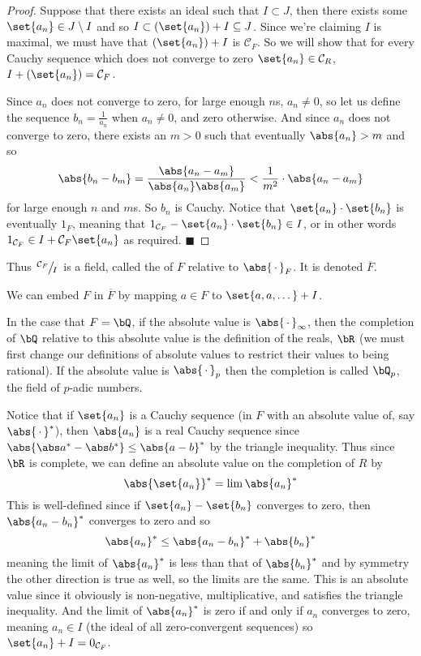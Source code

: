 \documentclass[10pt]{article}
\def\qed{%
    \ifmmode%
        \eqno\blacksquare%
    \else%
        \hskip1cm\allowbreak\hbox{}\nobreak\hfill$\blacksquare$%
    \fi%
}
\def\mC{\mathcal C}
\begin{document}
\begin{proof}

    Suppose that there exists an ideal such that $I\subset J$, then there exists some $\set{a_n}\in J\setminus I$ and so $I\subset(\set{a_n})+I\subseteq J$.
    Since we're claiming $I$ is maximal, we must have that $(\set{a_n})+I$ is $\mC_F$.
    So we will show that for every Cauchy sequence which does not converge to zero $\set{a_n}\in\mC_R$, $I+(\set{a_n})=\mC_F$.

    Since $a_n$ does not converge to zero, for large enough $n$s, $a_n\neq0$, so let us define the sequence $b_n=\frac1{a_n}$ when $a_n\neq0$, and zero otherwise.
    And since $a_n$ does not converge to zero, there exists an $m>0$ such that eventually $\abs{a_n}>m$ and so
    \[ \abs{b_n-b_m} = \frac{\abs{a_n-a_m}}{\abs{a_n}\abs{a_m}} < \frac1{m^2}\cdot\abs{a_n-a_m} \]
    for large enough $n$ and $m$s.
    So $b_n$ is Cauchy.
    Notice that $\set{a_n}\cdot\set{b_n}$ is eventually $1_F$, meaning that $1_{\mC_F}-\set{a_n}\cdot\set{b_n}\in I$, or in other words $1_{\mC_F}\in I+\mC_F\set{a_n}$ as required.
    \qed

\end{proof}

\begin{defn*}

    Thus $\slfrac{\mC_F}I$ is a field, called the  of $F$ relative to $\abs{\,\cdot\,}_F$.
    It is denoted $\overline F$.

\end{defn*}

We can embed $F$ in $\overline F$ by mapping $a\in F$ to $\set{a,a,\dots}+I$.

In the case that $F=\bQ$, if the absolute value is $\abs{\,\cdot\,}_\infty$, then the completion of $\bQ$ relative to this absolute value is the definition of the reals, $\bR$ (we must first change our
definitions of absolute values to restrict their values to being rational).
If the absolute value is $\abs{\,\cdot\,}_p$ then the completion is called $\bQ_p$, the field of $p$-adic numbers.

Notice that if $\set{a_n}$ is a Cauchy sequence (in $F$ with an absolute value of, say $\abs{\,\cdot\,}^*$), then $\abs{a_n}$ is a real Cauchy sequence since $\abs{\abs a^*-\abs b^*}\leq\abs{a-b}^*$ by the 
triangle inequality.
Thus since $\bR$ is complete, we can define an absolute value on the completion of $R$ by
\[ \abs{\set{a_n}}^* = \lim\abs{a_n}^* \]
This is well-defined since if $\set{a_n}-\set{b_n}$ converges to zero, then $\abs{a_n-b_n}^*$ converges to zero and so
\[ \abs{a_n}^* \leq \abs{a_n-b_n}^* + \abs{b_n}^* \]
meaning the limit of $\abs{a_n}^*$ is less than that of $\abs{b_n}^*$ and by symmetry the other direction is true as well, so the limits are the same.
This is an absolute value since it obviously is non-negative, multiplicative, and satisfies the triangle inequality.
And the limit of $\abs{a_n}^*$ is zero if and only if $a_n$ converges to zero, meaning $a_n\in I$ (the ideal of all zero-convergent sequences) so $\set{a_n}+I=0_{\mC_F}$.
\end{document}
